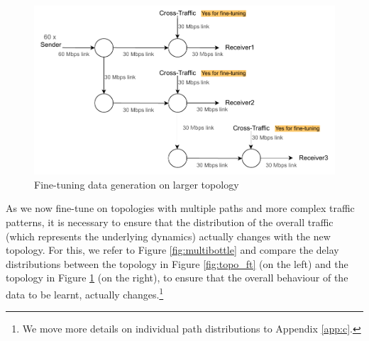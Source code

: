 \begin{figure}[h]
  \begin{center}
    \includegraphics[scale=0.7]{figures/complex_topo.pdf}
    \caption{Fine-tuning data generation on larger topology}
    \label{fig:topo_ft_big}
  \end{center}
\end{figure}

As we now fine-tune on topologies with multiple paths and more complex traffic patterns, it is necessary to ensure that the distribution of the overall traffic (which represents the underlying dynamics) actually changes with the new topology. For this, we refer to Figure \ref{fig:multibottle} and compare the delay distributions between the topology in Figure \ref{fig:topo_ft} (on the left) and the topology in Figure \ref{fig:topo_ft_big} (on the right), to ensure that the overall behaviour of the data to be learnt, actually changes.\footnote{We move more details on individual path distributions to Appendix \ref{app:c}.} 

